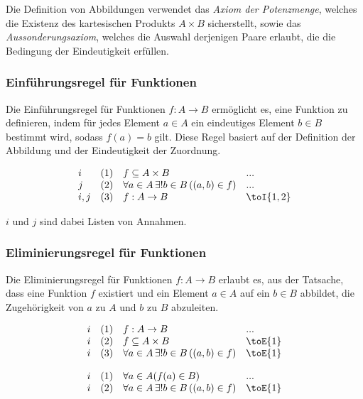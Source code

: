 \documentclass{book}
\theoremstyle{plain}
\theoremstyle{remark}
\theoremstyle{definition}
\begin{document}
Die Definition von Abbildungen verwendet das \textit{Axiom der Potenzmenge}, welches die Existenz des kartesischen Produkts \( A \times B \) sicherstellt, sowie das \textit{Aussonderungsaxiom}, welches die Auswahl derjenigen Paare erlaubt, die die Bedingung der Eindeutigkeit erfüllen.


\subsubsection*{Einführungsregel für Funktionen}
\label{rule:toI}
Die Einführungsregel für Funktionen \( f: A \to B \) ermöglicht es, eine Funktion zu definieren, indem für jedes Element \( a \in A \) ein eindeutiges Element \( b \in B \) bestimmt wird, sodass \( f(a) = b \) gilt. Diese Regel basiert auf der Definition der Abbildung und der Eindeutigkeit der Zuordnung.

\[
\begin{array}{llll}
    i       & (1) & f\subseteq A\times B & ... \\
    j       & (2) & \forall a \in A \, \exists! b \in B \, ((a, b) \in f) & ... \\
    i,j     & (3) & f:A\rightarrow B & \toI{1,2}
\end{array}
\]

\(i\) und \(j\) sind dabei Listen von Annahmen.

\subsubsection*{Eliminierungsregel für Funktionen}
\label{rule:toE}
Die Eliminierungsregel für Funktionen \( f: A \to B \) erlaubt es, aus der Tatsache, dass eine Funktion \( f \) existiert und ein Element \( a \in A \) auf ein \( b \in B \) abbildet, die Zugehörigkeit von \( a \) zu \( A \) und \( b \) zu \( B \) abzuleiten.

\[
\begin{array}{llll}
    i       & (1) & f:A\rightarrow B & ... \\
    i       & (2) & f\subseteq A\times B & \toE{1} \\
    i       & (3) & \forall a \in A \, \exists! b \in B \, ((a, b) \in f) & \toE{1} \\
\end{array}
\]

\[
\begin{array}{llll}
    i       & (1) & \forall a\in A(f(a)\in B) & ... \\
    i       & (2) & \forall a \in A \, \exists! b \in B \, ((a, b) \in f) & \toE{1} \\
\end{array}
\]
\end{document}
